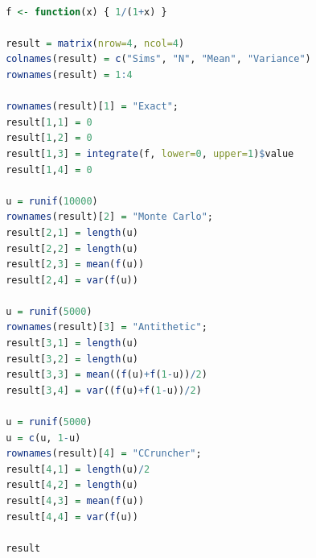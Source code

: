 \documentclass[11pt,fleqn]{book} %
\begin{document}
\begin{lstlisting}[language=R, label=sc:antithetic, caption=Antithetic example (R script)]

 f <- function(x) { 1/(1+x) }
 
 result = matrix(nrow=4, ncol=4)
 colnames(result) = c("Sims", "N", "Mean", "Variance")
 rownames(result) = 1:4

 rownames(result)[1] = "Exact";
 result[1,1] = 0
 result[1,2] = 0
 result[1,3] = integrate(f, lower=0, upper=1)$value
 result[1,4] = 0

 u = runif(10000)
 rownames(result)[2] = "Monte Carlo";
 result[2,1] = length(u)
 result[2,2] = length(u)
 result[2,3] = mean(f(u))
 result[2,4] = var(f(u))

 u = runif(5000)
 rownames(result)[3] = "Antithetic";
 result[3,1] = length(u)
 result[3,2] = length(u)
 result[3,3] = mean((f(u)+f(1-u))/2)
 result[3,4] = var((f(u)+f(1-u))/2)

 u = runif(5000)
 u = c(u, 1-u)
 rownames(result)[4] = "CCruncher";
 result[4,1] = length(u)/2
 result[4,2] = length(u)
 result[4,3] = mean(f(u))
 result[4,4] = var(f(u))
 
 result

\end{lstlisting}






\end{document}
